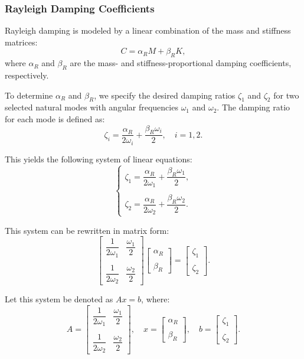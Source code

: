 \documentclass{article}
\begin{document}
	\subsubsection{Rayleigh Damping Coefficients}
	Rayleigh damping is modeled by a linear combination of the mass and stiffness matrices:
	\begin{equation}
		{C} = \alpha_R {M} + \beta_R {K},
	\end{equation}
	where \( \alpha_R \) and \( \beta_R \) are the mass- and stiffness-proportional damping coefficients, respectively.
	
	To determine \( \alpha_R \) and \( \beta_R \), we specify the desired damping ratios \( \zeta_1 \) and \( \zeta_2 \) for two selected natural modes with angular frequencies \( \omega_1 \) and \( \omega_2 \). The damping ratio for each mode is defined as:
	\begin{equation}
		\zeta_i = \frac{\alpha_R}{2\omega_i} + \frac{\beta_R \omega_i}{2}, \quad i = 1, 2.
	\end{equation}
	
	This yields the following system of linear equations:
	\[
	\begin{cases}
		\zeta_1 = \dfrac{\alpha_R}{2\omega_1} + \dfrac{\beta_R \omega_1}{2}, \\\\
		\zeta_2 = \dfrac{\alpha_R}{2\omega_2} + \dfrac{\beta_R \omega_2}{2}.
	\end{cases}
	\]
	
	This system can be rewritten in matrix form:
	\begin{equation}
		\begin{bmatrix}
			\dfrac{1}{2\omega_1} & \dfrac{\omega_1}{2} \\\\
			\dfrac{1}{2\omega_2} & \dfrac{\omega_2}{2}
		\end{bmatrix}
		\begin{bmatrix}
			\alpha_R \\\\
			\beta_R
		\end{bmatrix}
		=
		\begin{bmatrix}
			\zeta_1 \\\\
			\zeta_2
		\end{bmatrix}.
	\end{equation}
	
	Let this system be denoted as \( {A}{x} = {b} \), where:
	\[
	{A} =
	\begin{bmatrix}
		\dfrac{1}{2\omega_1} & \dfrac{\omega_1}{2} \\\\
		\dfrac{1}{2\omega_2} & \dfrac{\omega_2}{2}
	\end{bmatrix},
	\quad
	{x} =
	\begin{bmatrix}
		\alpha_R \\\\
		\beta_R
	\end{bmatrix},
	\quad
	{b} =
	\begin{bmatrix}
		\zeta_1 \\\\
		\zeta_2
	\end{bmatrix}.
	\]
	
\end{document}
